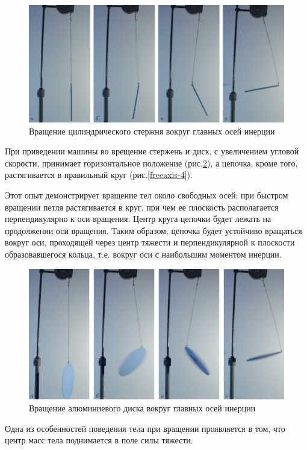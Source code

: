 \documentclass[14pt,a4paper,oneside]{extarticle}	%
\begin{document}
\begin{figure}[H] 
	\centering 		
	\includegraphics[width=0.9\linewidth]{freeaxis-2.png}
	\caption{Вращение цилиндрического стержня вокруг главных осей инерции}
	\label{freeaxis-2}
\end{figure}

При приведении машины во врещение стержень и диск, с увеличением угловой скорости, принимает горизонтальное положение (рис.\ref{freeaxis-3}), а цепочка, кроме того, растягивается в правильный круг (рис.\ref{freeaxis-4}).

Этот опыт демонстрирует вращение тел около свободных осей: при быстром вращении петля растягивается в круг, при чем ее плоскость располагается перпендикулярно к оси вращения. Центр круга цепочки будет лежать на продолжении оси вращения. Таким образом, цепочка будет устойчиво вращаться вокруг оси, проходящей через центр тяжести и перпендикулярной к плоскости образовавшегося кольца, т.е. вокруг оси с наибольшим моментом инерции.

\begin{figure}[H] 	
	\centering 		
	\includegraphics[width=0.9\linewidth]{freeaxis-3.png}
	\caption{Вращение алюминиевого диска вокруг главных осей инерции}
	\label{freeaxis-3}
\end{figure}

Одна из особенностей поведения тела при вращении проявляется в том, что центр масс тела поднимается в поле силы тяжести.
\end{document}
